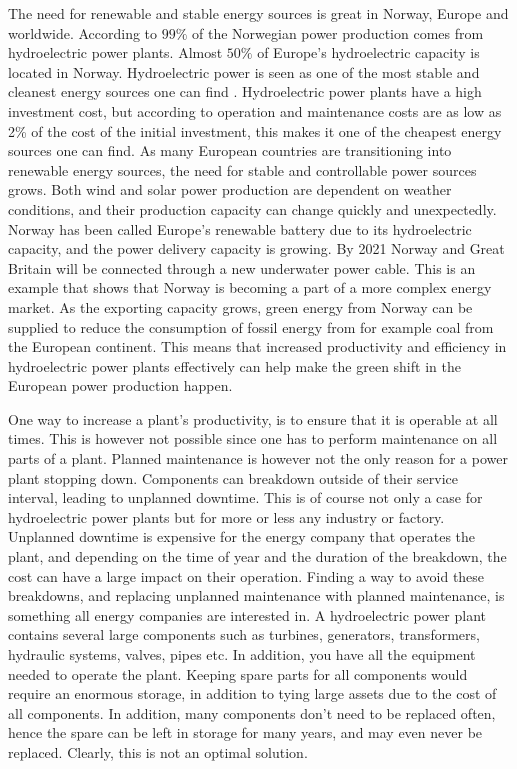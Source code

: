 The need for renewable and stable energy sources is great in Norway, Europe and worldwide. According to \cite{Statkraft2009} $99\%$ of the Norwegian power production comes from hydroelectric power plants. Almost $50\%$ of Europe's hydroelectric capacity is located in Norway. Hydroelectric power is seen as one of the most stable and cleanest energy sources one can find \cite{Statkraft2009}. Hydroelectric power plants have a high investment cost, but according to \cite{Selak2014} operation and maintenance costs are as low as 2\% of the cost of the initial investment, this makes it one of the cheapest energy sources one can find. As many European countries are transitioning into renewable energy sources, the need for stable and controllable power sources grows. Both wind and solar power production are dependent on weather conditions, and their production capacity can change quickly and unexpectedly. Norway has been called Europe's renewable battery due to its hydroelectric capacity, and the power delivery capacity is growing. By 2021 Norway and Great Britain will be connected through a new underwater power cable. This is an example that shows that Norway is becoming a part of a more complex energy market. As the exporting capacity grows, green energy from Norway can be supplied to reduce the consumption of fossil energy from for example coal from the European continent. This means that increased productivity and efficiency in hydroelectric power plants effectively can help make the green shift in the European power production happen. 

One way to increase a plant's productivity, is to ensure that it is operable at all times. This is however not possible since one has to perform maintenance on all parts of a plant. Planned maintenance is however not the only reason for a power plant stopping down. Components can breakdown outside of their service interval, leading to unplanned downtime. This is of course not only a case for hydroelectric power plants but for more or less any industry or factory. Unplanned downtime is expensive for the energy company that operates the plant, and depending on the time of year and the duration of the breakdown, the cost can have a large impact on their operation. Finding a way to avoid these breakdowns, and replacing unplanned maintenance with planned maintenance, is something all energy companies are interested in. A hydroelectric power plant contains several large components such as turbines, generators, transformers, hydraulic systems, valves, pipes etc. In addition, you have all the equipment needed to operate the plant. Keeping spare parts for all components would require an enormous storage, in addition to tying large assets due to the cost of all components. In addition, many components don't need to be replaced often, hence the spare can be left in storage for many years, and may even never be replaced. Clearly, this is not an optimal solution. 

